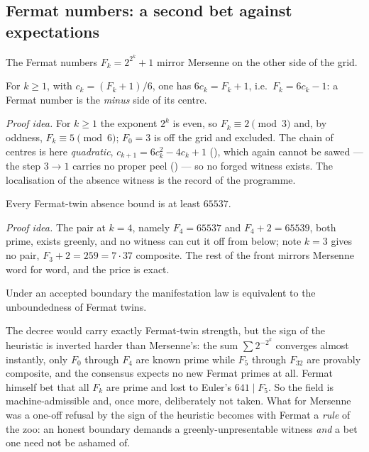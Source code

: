 \subsection{Fermat numbers: a second bet against expectations}

The Fermat numbers $F_k=2^{2^k}+1$ mirror Mersenne on the other side of the grid.

\begin{theorem}\label{thm:six_mul_fermatCenter}
\green{}\; For $k\ge1$, with $c_k=(F_k+1)/6$, one has $6c_k=F_k+1$, i.e.\ $F_k=6c_k-1$: a Fermat
number is the \emph{minus} side of its centre. 
\end{theorem}

\emph{Proof idea.} For $k\ge1$ the exponent $2^k$ is even, so $F_k\equiv2\pmod3$ and, by oddness,
$F_k\equiv5\pmod6$; $F_0=3$ is off the grid and excluded. The chain of centres is here
\emph{quadratic}, $c_{k+1}=6c_k^2-4c_k+1$ (\green{}), which again cannot be sawed --- the step
$3\to1$ carries no proper peel (\green{}) --- so no forged witness exists. The
localisation of the absence witness is the record of the programme.

\begin{theorem}\label{thm:fermatAbsenceBound_ge_65537}
\green{}\; Every Fermat-twin absence bound is at least $65537$.
\end{theorem}

\emph{Proof idea.} The pair at $k=4$, namely $F_4=65537$ and $F_4+2=65539$, both prime, exists
greenly, and no witness can cut it off from below; note $k=3$ gives no pair, $F_3+2=259=7\cdot37$
composite. The rest of the front mirrors Mersenne word for word, and the price is exact.

\begin{theorem}\label{thm:fermatManifestationLaw_iff_unbounded_of_boundary}
\green{}\; Under an accepted boundary the manifestation law is equivalent to the unboundedness of
Fermat twins. 
\end{theorem}

The decree would carry exactly Fermat-twin strength, but the sign of the heuristic is inverted
harder than Mersenne's: the sum $\sum 2^{-2^k}$ converges almost instantly, only $F_0$ through
$F_4$ are known prime while $F_5$ through $F_{32}$ are provably composite, and the consensus expects
no new Fermat primes at all. Fermat himself bet that all $F_k$ are prime and lost to Euler's
$641\mid F_5$. So the field  is machine-admissible and, once more, deliberately
not taken. What for Mersenne was a one-off refusal by the sign of the heuristic becomes with Fermat
a \emph{rule} of the zoo: an honest boundary demands a greenly-unpresentable witness \emph{and} a
bet one need not be ashamed of.

